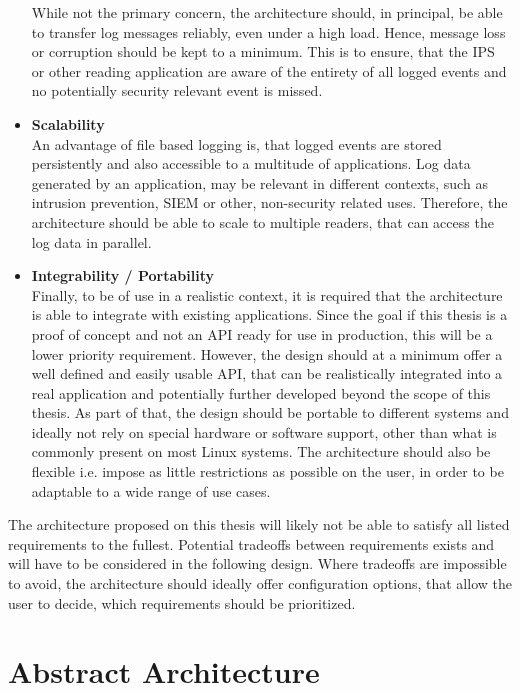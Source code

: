 \begin{itemize}
    While not the primary concern, the architecture should, in principal, be able to transfer log messages reliably, even under a high load. Hence, message loss or corruption 
    should be kept to a minimum. This is to ensure, that the \ac{IPS} or other reading application are aware of the entirety of all logged events and no potentially security relevant event is missed. 
    \item \textbf{Scalability} \\
    An advantage of file based logging is, that logged events are stored persistently and also accessible to a multitude of applications. Log data generated by an application, may be relevant in different
    contexts, such as intrusion prevention, \ac{SIEM} or other, non-security related uses. Therefore, the architecture should be able to scale to multiple readers, that can access the log data in parallel. 
    \item \textbf{Integrability / Portability} \\
    Finally, to be of use in a realistic context, it is required that the architecture is able to integrate with existing applications. Since the goal if this thesis is a proof of concept and not an 
    API ready for use in production, this will be a lower priority requirement. However, the design should at a minimum offer a well defined and easily usable API, that can be realistically integrated into a real application
    and potentially further developed beyond the scope of this thesis. As part of that, the design should be portable to different systems and ideally not rely on special hardware or software support, other than what
    is commonly present on most Linux systems. The architecture should also be flexible i.e. impose as little restrictions as possible on the user, in order to be adaptable to a wide range of use cases.  

\end{itemize}

The architecture proposed on this thesis will likely not be able to satisfy all listed requirements to the fullest. Potential tradeoffs between requirements exists and will have to be considered in the following
design. Where tradeoffs are impossible to avoid, the architecture should ideally offer configuration options, that allow the user to decide, which requirements should be prioritized.       

\section{Abstract Architecture}

